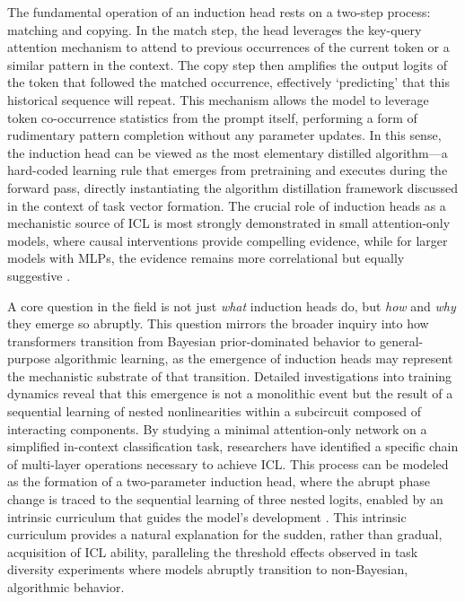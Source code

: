 \documentclass[11pt]{article}
\begin{document}
The fundamental operation of an induction head rests on a two-step process: matching and copying. In the match step, the head leverages the key-query attention mechanism to attend to previous occurrences of the current token or a similar pattern in the context. The copy step then amplifies the output logits of the token that followed the matched occurrence, effectively `predicting' that this historical sequence will repeat. This mechanism allows the model to leverage token co-occurrence statistics from the prompt itself, performing a form of rudimentary pattern completion without any parameter updates. In this sense, the induction head can be viewed as the most elementary distilled algorithm---a hard-coded learning rule that emerges from pretraining and executes during the forward pass, directly instantiating the algorithm distillation framework discussed in the context of task vector formation. The crucial role of induction heads as a mechanistic source of ICL is most strongly demonstrated in small attention-only models, where causal interventions provide compelling evidence, while for larger models with MLPs, the evidence remains more correlational but equally suggestive \cite{ref54}.

A core question in the field is not just \emph{what} induction heads do, but \emph{how} and \emph{why} they emerge so abruptly. This question mirrors the broader inquiry into how transformers transition from Bayesian prior-dominated behavior to general-purpose algorithmic learning, as the emergence of induction heads may represent the mechanistic substrate of that transition. Detailed investigations into training dynamics reveal that this emergence is not a monolithic event but the result of a sequential learning of nested nonlinearities within a subcircuit composed of interacting components. By studying a minimal attention-only network on a simplified in-context classification task, researchers have identified a specific chain of multi-layer operations necessary to achieve ICL. This process can be modeled as the formation of a two-parameter induction head, where the abrupt phase change is traced to the sequential learning of three nested logits, enabled by an intrinsic curriculum that guides the model's development \cite{ref55}. This intrinsic curriculum provides a natural explanation for the sudden, rather than gradual, acquisition of ICL ability, paralleling the threshold effects observed in task diversity experiments where models abruptly transition to non-Bayesian, algorithmic behavior.
\end{document}
